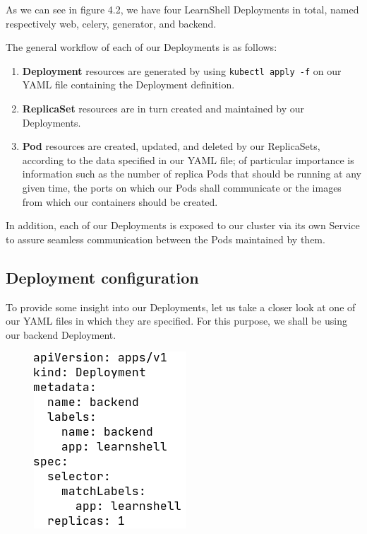 \documentclass[thesis=B,english]{FITthesis}[2019/12/23]
\begin{document}
As we can see in figure 4.2, we have four LearnShell Deployments in total, named respectively web, celery, generator, and backend.

The general workflow of each of our Deployments is as follows:

\begin{enumerate}
  \setlength\itemsep{0em}
  \item \textbf{Deployment} resources are generated by using \verb|kubectl apply -f| on our YAML file containing the Deployment definition.
  \item \textbf{ReplicaSet} resources are in turn created and maintained by our Deployments.
  \item \textbf{Pod} resources are created, updated, and deleted by our ReplicaSets, according to the data specified in our YAML file; of particular importance is information such as the number of replica Pods that should be running at any given time, the ports on which our Pods shall communicate or the images from which our containers should be created.
\end{enumerate}

In addition, each of our Deployments is exposed to our cluster via its own Service to assure seamless communication between the Pods maintained by them.

\subsection{Deployment configuration}

To provide some insight into our Deployments, let us take a closer look at one of our YAML files in which they are specified. For this purpose, we shall be using our backend Deployment.

\begin{figure}[H]
\centering
\hspace*{-0.5cm}
\includegraphics[scale=0.5]{deploy-backend1}
\end{figure}
\end{document}
